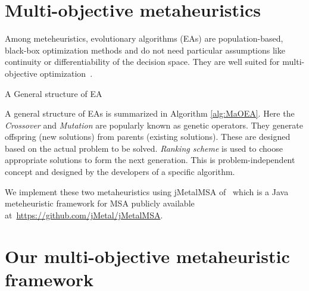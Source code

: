 \section{Multi-objective metaheuristics}
Among meteheuristics, evolutionary algorithms (EAs) are population-based, black-box optimization methods and do not need particular assumptions like continuity or differentiability of the decision space. They are well suited for multi-objective optimization~\cite{yang2013grid}. 

\begin{algorithm}[!htb]
	\caption{A General structure of EA}
	\begin{algorithmic}[1]\label{alg:MaOEA}
		\ENDWHILE
	\end{algorithmic}
\end{algorithm}

A general structure of EAs is summarized in Algorithm \ref{alg:MaOEA}. Here the \textit{Crossover} and \textit{Mutation} are popularly known as genetic operators. They generate offspring (new solutions) from parents (existing solutions). These are designed based on the actual problem to be solved. \textit{Ranking scheme} is used to choose appropriate solutions to form the next generation. This is problem-independent concept and designed by the developers of a specific algorithm.

 We implement these two metaheuristics using jMetalMSA of~\citealp{zambrano2017multi} which is a Java meteheuristic framework for MSA publicly available at~\url{https://github.com/jMetal/jMetalMSA}. 



\section{Our multi-objective metaheuristic framework}


